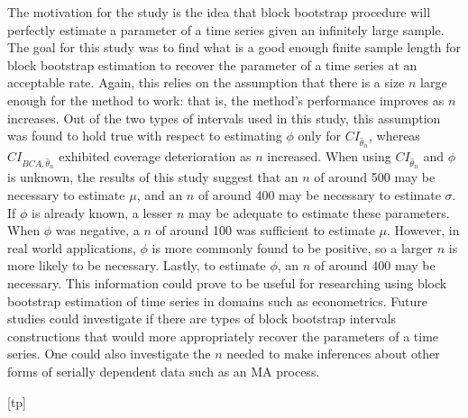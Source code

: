\documentclass[12pt, letterpaper, titlepage]{article}
\begin{document}
The motivation for the study is the idea that block bootstrap procedure will
perfectly estimate a parameter of a time series given an infinitely large
sample. The goal for this study was to find what is a good enough finite
sample length for block bootstrap estimation to recover the parameter of a
time series at an acceptable rate. Again, this relies on the assumption that
there is a size $n$ large enough for the method to work: that is, the method's
performance improves as $n$ increases. Out of the two types of intervals used
in this study, this assumption was found to hold true with respect to
estimating $\phi$ only for $CI_{\hat{\theta}_{n}}$, whereas
$CI_{BCA, \hat{\theta}_{n}}$ exhibited coverage deterioration as $n$
increased. When using $CI_{\hat{\theta}_{n}}$ and $\phi$ is unknown, the
results of this study suggest that an $n$ of around 500 may be necessary to
estimate $\mu$, and an $n$ of around 400 may be necessary to estimate
$\sigma$. If $\phi$ is already known, a lesser $n$ may be adequate to estimate
these parameters. When $\phi$ was negative, a $n$ of around 100 was sufficient
to estimate $\mu$. However, in real world applications, $\phi$ is more
commonly found to be positive, so a larger $n$ is more likely to be necessary.
Lastly, to estimate $\phi$, an $n$ of around 400 may be necessary. This
information could prove to be useful for researching using block bootstrap
estimation of time series in domains such as econometrics. Future studies
could investigate if there are types of block bootstrap intervals
constructions that would more appropriately recover the parameters of a time
series. One could also investigate the $n$ needed to make inferences about
other forms of serially dependent data such as an MA process.



[tp]
\end{document}
